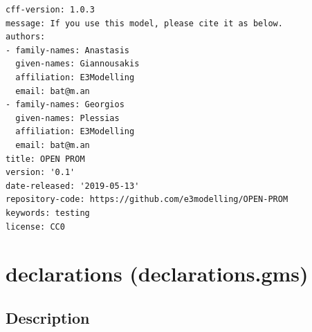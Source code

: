 \documentclass[a4paper,]{scrartcl}
\begin{document}
\begin{lstlisting}
cff-version: 1.0.3
message: If you use this model, please cite it as below.
authors:
- family-names: Anastasis
  given-names: Giannousakis
  affiliation: E3Modelling
  email: bat@m.an
- family-names: Georgios
  given-names: Plessias
  affiliation: E3Modelling
  email: bat@m.an
title: OPEN PROM
version: '0.1'
date-released: '2019-05-13'
repository-code: https://github.com/e3modelling/OPEN-PROM
keywords: testing
license: CC0
\end{lstlisting}

\pagebreak

\section{declarations (declarations.gms)}\label{id-declarations.gms}

\subsection{Description}\label{description}
\end{document}
